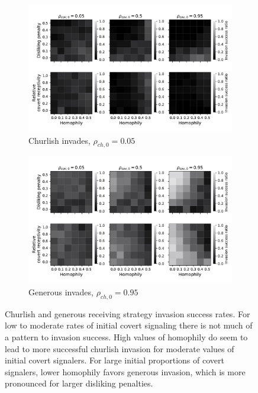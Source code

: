 \documentclass[11pt,letterpaper]{article}
\begin{document}
\begin{figure}[H]
  \centering
    \begin{subfigure}{0.49\textwidth}
      \includegraphics[width=\textwidth]{Figures/churlish_invades.pdf}
      \caption{Churlish invades, $\rho_{ch,0}=0.05$}
    \end{subfigure}
    \begin{subfigure}{0.49\textwidth}
      \includegraphics[width=\textwidth]{Figures/generous_invades.pdf}
      \caption{Generous invades, $\rho_{ch,0}=0.95$}
    \end{subfigure}
  \caption{Churlish and generous receiving strategy invasion success rates.
    For low to moderate rates of initial covert signaling there is not much
    of a pattern to invasion success. High values of homophily do seem to lead
    to more successful churlish invasion for moderate values of initial
    covert signalers. For large initial proportions of covert
    signalers, lower homophily favors generous invasion, which is more pronounced
    for larger disliking penalties.
  }
  \label{fig:ch-gen-invade}
\end{figure}
\end{document}
